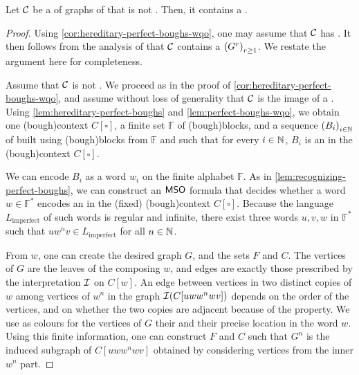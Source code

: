 \begin{lemma}[name={},restate=lem:regular-antichain]
  \label{lem:regular-antichain}
  Let $\Cls$ be a  of graphs of 
  that is not . Then, it contains 
  a .
\end{lemma}

\begin{proof}
  Using 
  \cref{cor:hereditary-perfect-boughs-wqo}, one may assume that $\Cls$
  has . It then follows from
  the analysis of \cite{LOPEZ24} that 
  $\Cls$ contains a  $\seqof{G^r}[r \geq 1]$.
  We restate the argument here for completeness.

  Assume that $\Cls$ is not . We proceed as
  in the proof of \cref{cor:hereditary-perfect-boughs-wqo},
  and assume without loss of generality that $\Cls$ is the image of 
  a .
  Using \cref{lem:hereditary-perfect-boughs} and \cref{lem:perfect-boughs-wqo},
  we obtain one \kl(bough){context} $C[\square]$, a finite set $\mathbb{F}$ of
  \kl(bough){blocks}, and a sequence $\seqof{B_i}[i \in \Nat]$ of 
  built using \kl(bough){blocks} from $\mathbb{F}$ and such that for every $i
  \in \mathbb{N}$, $B_i$ is an  in the \kl(bough){context}
  $C[\square]$. 

  We can encode $B_i$ as a word $w_i$ on the finite alphabet $\mathbb{F}$.
  As in \cref{lem:recognizing-perfect-boughs}, we can construct an
  $\mathsf{MSO}$ formula that decides whether a word $w \in \mathbb{F}^*$ encodes an
   in the (fixed) \kl(bough){context} $C[\square]$. Because
  the language $L_\text{imperfect}$ of such words is regular and infinite,
  there exist three words $u,v,w$ in $\mathbb{F}^*$ such that $u w^n v \in
  L_\text{imperfect}$ for all $n \in \mathbb{N}$.

  From $w$, one can create the desired graph $G$, and the sets $F$ and $C$. The
  vertices of $G$ are the leaves of the  composing $w$, and
  edges are exactly those prescribed by the interpretation $\mathcal{I}$ on
  $C[w]$. An edge between vertices in two distinct copies of $w$ among vertices
  of $w^n$ in the graph $\mathcal{I}(C[uw w^n wv])$ depends on
  the order of the vertices, and on whether the two copies are adjacent
  because of the  property. We use as colours for the
  vertices of $G$ their  and their precise location in the word
  $w$. Using this finite information, one can construct $F$ and $C$ such that
  $G^n$ is the induced subgraph of $C[u w w^n w v]$ obtained by considering
  vertices from the inner $w^n$ part.


\end{proof}
